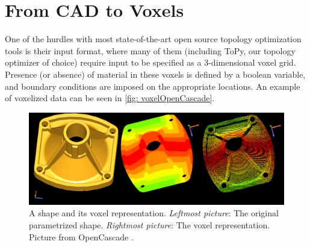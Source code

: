 \section{From \acs{CAD} to Voxels}

\label{sec: CADToVoxels}
One of the hurdles with most state-of-the-art open source topology optimization tools is their input format, where many of them (including ToPy, our topology optimizer of choice) require input to be specified as a 3-dimensional voxel grid. Presence (or absence) of material in these voxels is defined by a boolean variable, and boundary conditions are imposed on the appropriate locations. An example of voxelized data can be seen in \autoref{fig: voxelOpenCascade}. %









\begin{figure}
\centering
  \includegraphics[scale=0.3]{Pictures/CADToVoxel/voxels_wp_image005.png}
\caption{A shape and its voxel representation. \emph{Leftmost picture}: The original parametrized shape. \emph{Rightmost picture}: The voxel representation. Picture from OpenCascade \cite{OpenCascade}.}
\label{fig: voxelOpenCascade}
\end{figure}

